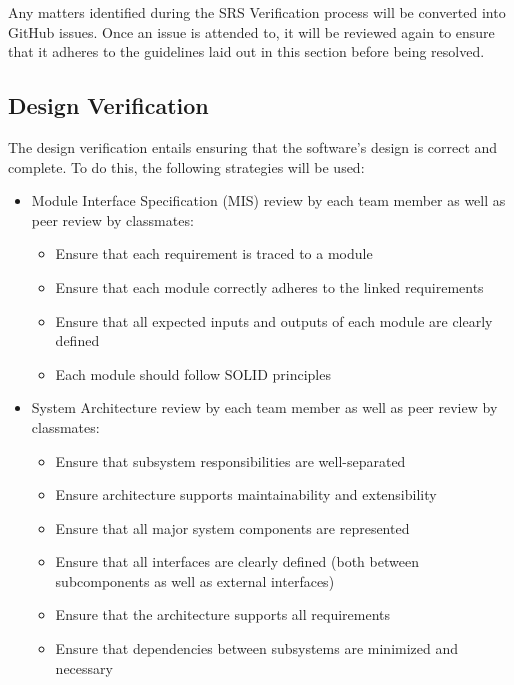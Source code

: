 \documentclass[12pt, titlepage]{article}
\renewcommand{\wss}[1]{}
\begin{document}
Any matters identified during the SRS Verification process will be converted into GitHub issues. Once an issue is attended to, it will be reviewed again to ensure that it adheres to the guidelines laid out in this section before being resolved.

\subsection{Design Verification}

\wss{Plans for design verification}

\wss{The review will include reviews by your classmates}

\wss{Create a checklists?}

The design verification entails ensuring that the software's design is correct and complete. To do this, the following strategies will be used:

\begin{itemize}
  \item Module Interface Specification (MIS) review by each team member as well as peer review by classmates:
  \begin{itemize}
    \item Ensure that each requirement is traced to a module
    \item Ensure that each module correctly adheres to the linked requirements
    \item Ensure that all expected inputs and outputs of each module are clearly defined
    \item Each module should follow SOLID principles
  \end{itemize}
  \item System Architecture review by each team member as well as peer review by classmates:
  \begin{itemize}
    \item Ensure that subsystem responsibilities are well-separated
    \item Ensure architecture supports maintainability and extensibility
    \item Ensure that all major system components are represented
    \item Ensure that all interfaces are clearly defined (both between subcomponents as well as external interfaces)
    \item Ensure that the architecture supports all requirements
    \item Ensure that dependencies between subsystems are minimized and necessary
  \end{itemize}
\end{itemize}
\end{document}
